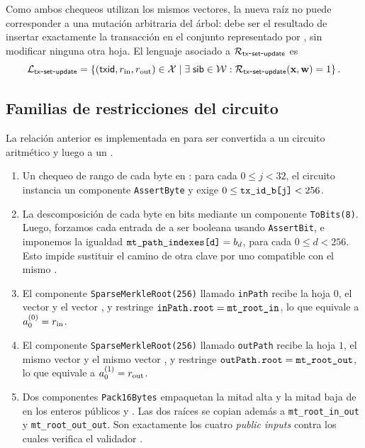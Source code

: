 Como ambos chequeos utilizan los mismos vectores, la nueva raíz \RootOut no puede corresponder a una mutación arbitraria del árbol: debe ser el resultado de insertar exactamente la transacción \TxId en el conjunto representado por \RootIn, sin modificar ninguna otra hoja. El lenguaje asociado a $\mathcal{R}_{\mathsf{tx\mbox{-}set\mbox{-}update}}$ es
$$\mathcal{L}_{\mathsf{tx\mbox{-}set\mbox{-}update}} = \left\{(\mathsf{txid}, r_{\mathrm{in}}, r_{\mathrm{out}}) \in \mathcal{X} \;\middle|\; \exists \; \mathsf{sib} \in \mathcal{W}: \mathcal{R}_{\mathsf{tx\mbox{-}set\mbox{-}update}}(\mathbf{x},\mathbf{w})=1 \right\}.$$

\subsection{Familias de restricciones del circuito}
\label{subsec:tx-set-update-familias-de-restricciones-del-circuito}

La relación anterior es implementada en \Circom para ser convertida a un circuito aritmético y luego a un \QAP.

\begin{enumerate}[noitemsep]
	\item Un chequeo de rango de cada byte en \TxIdBytesArray: para cada $0 \leq j < 32$, el circuito instancia un componente \texttt{AssertByte} y exige $0 \leq \texttt{tx\_id\_b[j]} < 256$.
	\item La descomposición de cada byte  en bits mediante un componente \texttt{ToBits(8)}. Luego, forzamos cada entrada de \MtPathIndexesArray a ser booleana usando \texttt{AssertBit}, e imponemos la igualdad $\texttt{mt\_path\_indexes[d]} = b_d$, para cada $0 \leq d < 256$. Esto impide sustituir el camino de otra clave por uno compatible con el mismo \SiblingVec.
	\item El componente \texttt{SparseMerkleRoot(256)} llamado \texttt{inPath} recibe la hoja $0$, el vector  y el vector , y restringe $\texttt{inPath.root} = \texttt{mt\_root\_in}$, lo que equivale a $a_0^{(0)} = r_{\mathrm{in}}$.
	\item El componente \texttt{SparseMerkleRoot(256)} llamado \texttt{outPath} recibe la hoja $1$, el mismo vector  y el mismo vector , y restringe $\texttt{outPath.root} = \texttt{mt\_root\_out}$, lo que equivale a $a_0^{(1)} = r_{\mathrm{out}}$.
	\item Dos componentes \texttt{Pack16Bytes} empaquetan la mitad alta y la mitad baja de  en los enteros públicos \TxIdHi y \TxIdLo. Las dos raíces se copian además a \texttt{mt\_root\_in\_out} y \texttt{mt\_root\_out\_out}. Son exactamente los cuatro \textit{public inputs} contra los cuales verifica el validador \Onchain.
\end{enumerate}

